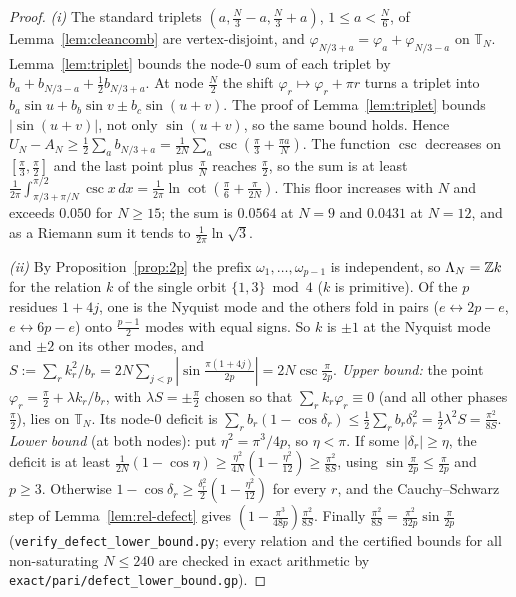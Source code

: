 \begin{proof}
\emph{(i)} The standard triplets $(a,\tfrac N3-a,\tfrac N3+a)$, $1\le a<\tfrac N6$, of
Lemma~\ref{lem:cleancomb} are vertex-disjoint, and $\varphi_{N/3+a}=\varphi_a+\varphi_{N/3-a}$ on
$\mathbb T_N$. Lemma~\ref{lem:triplet} bounds the node-$0$ sum of each triplet by
$b_a+b_{N/3-a}+\tfrac12b_{N/3+a}$. At node $\tfrac N2$ the shift $\varphi_r\mapsto\varphi_r+\pi r$ turns a
triplet into $b_a\sin u+b_b\sin v\pm b_c\sin(u+v)$. The proof of Lemma~\ref{lem:triplet} bounds
$|\sin(u+v)|$, not only $\sin(u+v)$, so the same bound holds. Hence
$U_N-A_N\ge\tfrac12\sum_ab_{N/3+a}=\tfrac1{2N}\sum_a\csc(\tfrac\pi3+\tfrac{\pi a}N)$. The function $\csc$
decreases on $[\tfrac\pi3,\tfrac\pi2]$ and the last point plus $\tfrac\pi N$ reaches $\tfrac\pi2$, so the sum is at
least $\tfrac1{2\pi}\int_{\pi/3+\pi/N}^{\pi/2}\csc x\,dx=\tfrac1{2\pi}\ln\cot(\tfrac\pi6+\tfrac\pi{2N})$. This floor
increases with $N$ and exceeds $0.050$ for $N\ge15$; the sum is $0.0564$ at $N=9$ and $0.0431$ at $N=12$, and as
a Riemann sum it tends to $\tfrac1{2\pi}\ln\sqrt3$.

\emph{(ii)} By Proposition~\ref{prop:2p} the prefix $\omega_1,\dots,\omega_{p-1}$ is independent, so
$\Lambda_N=\mathbb{Z} k$ for the relation $k$ of the single orbit $\{1,3\}\bmod4$ ($k$ is primitive). Of the $p$
residues $1+4j$, one is the Nyquist mode and the others fold in pairs ($e\leftrightarrow2p-e$,
$e\leftrightarrow6p-e$) onto $\tfrac{p-1}2$ modes with equal signs. So $k$ is $\pm1$ at the Nyquist mode and
$\pm2$ on its other modes, and $S:=\sum_rk_r^2/b_r=2N\sum_{j<p}|\sin\tfrac{\pi(1+4j)}{2p}|=2N\csc\tfrac\pi{2p}$. \emph{Upper bound:} the point
$\varphi_r=\tfrac\pi2+\lambda k_r/b_r$, with $\lambda S=\pm\tfrac\pi2$ chosen so that
$\sum_rk_r\varphi_r\equiv0$ (and all other phases $\tfrac\pi2$), lies on $\mathbb T_N$. Its node-$0$ deficit is
$\sum_rb_r(1-\cos\delta_r)\le\tfrac12\sum_rb_r\delta_r^2=\tfrac12\lambda^2S=\tfrac{\pi^2}{8S}$.
\emph{Lower bound} (at both nodes): put $\eta^2=\pi^3/4p$, so $\eta<\pi$. If some $|\delta_r|\ge\eta$, the deficit
is at least $\tfrac1{2N}(1-\cos\eta)\ge\tfrac{\eta^2}{4N}(1-\tfrac{\eta^2}{12})\ge\tfrac{\pi^2}{8S}$, using
$\sin\tfrac\pi{2p}\le\tfrac\pi{2p}$ and $p\ge3$. Otherwise $1-\cos\delta_r\ge\tfrac{\delta_r^2}2(1-\tfrac{\eta^2}{12})$
for every $r$, and the Cauchy--Schwarz step of Lemma~\ref{lem:rel-defect} gives
$(1-\tfrac{\pi^3}{48p})\tfrac{\pi^2}{8S}$. Finally $\tfrac{\pi^2}{8S}=\tfrac{\pi^2}{32p}\sin\tfrac\pi{2p}$
(\texttt{verify\_defect\_lower\_bound.py}; every relation and the certified bounds for all non-saturating
$N\le240$ are checked in exact arithmetic by \texttt{exact/pari/defect\_lower\_bound.gp}).
\end{proof}

